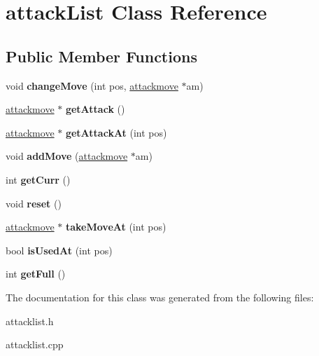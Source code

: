\hypertarget{classattack_list}{\section{attack\-List Class Reference}
\label{classattack_list}
}
\subsection*{Public Member Functions}
\begin{DoxyCompactItemize}
\item 
\hypertarget{classattack_list_a8bf01a96841205373a2b179c251f6388}{void {\bfseries change\-Move} (int pos, \hyperlink{classattackmove}{attackmove} $\ast$am)}\label{classattack_list_a8bf01a96841205373a2b179c251f6388}

\item 
\hypertarget{classattack_list_acc9d91fc5f10690b2516c123f13f0342}{\hyperlink{classattackmove}{attackmove} $\ast$ {\bfseries get\-Attack} ()}\label{classattack_list_acc9d91fc5f10690b2516c123f13f0342}

\item 
\hypertarget{classattack_list_a40cb4a49c6403918add3cb4a7043788b}{\hyperlink{classattackmove}{attackmove} $\ast$ {\bfseries get\-Attack\-At} (int pos)}\label{classattack_list_a40cb4a49c6403918add3cb4a7043788b}

\item 
\hypertarget{classattack_list_af20e3de4d59258a9e582dc121f0c4bf7}{void {\bfseries add\-Move} (\hyperlink{classattackmove}{attackmove} $\ast$am)}\label{classattack_list_af20e3de4d59258a9e582dc121f0c4bf7}

\item 
\hypertarget{classattack_list_a4efb6e2ae4c3c66b30dbd3e0cc9e330f}{int {\bfseries get\-Curr} ()}\label{classattack_list_a4efb6e2ae4c3c66b30dbd3e0cc9e330f}

\item 
\hypertarget{classattack_list_aef5ebb7304e4f34836a8676398765184}{void {\bfseries reset} ()}\label{classattack_list_aef5ebb7304e4f34836a8676398765184}

\item 
\hypertarget{classattack_list_aa18c2e5fa916658ca18e2d6c94c6fd25}{\hyperlink{classattackmove}{attackmove} $\ast$ {\bfseries take\-Move\-At} (int pos)}\label{classattack_list_aa18c2e5fa916658ca18e2d6c94c6fd25}

\item 
\hypertarget{classattack_list_a251544ca7d79dcaf59e064e6a48480cc}{bool {\bfseries is\-Used\-At} (int pos)}\label{classattack_list_a251544ca7d79dcaf59e064e6a48480cc}

\item 
\hypertarget{classattack_list_a75067d40efdb02cc7011ccd3feb519b9}{int {\bfseries get\-Full} ()}\label{classattack_list_a75067d40efdb02cc7011ccd3feb519b9}

\end{DoxyCompactItemize}


The documentation for this class was generated from the following files\-:\begin{DoxyCompactItemize}
\item 
attacklist.\-h\item 
attacklist.\-cpp\end{DoxyCompactItemize}
